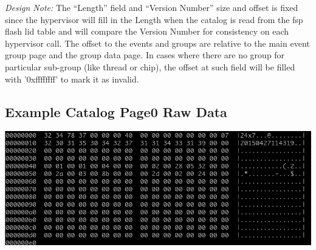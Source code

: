 \documentclass[14]{article}
\begin{document}
\textit{Design Note:} The “Length” field and “Version Number” size and offset is fixed
since the hypervisor will fill in the Length when the catalog is read from the
fsp flash lid table and will compare the Version Number for consistency on each
hypervisor call. The offset to the events and groups are relative to the main
event group page and the group data page. In cases where there are no group for
particular sub-group (like thread or chip), the offset at such field will be
filled with '0xffffffff' to mark it as invalid.

\subsection{Example Catalog Page0 Raw Data}
\includegraphics[scale=0.6]{page0_raw.png}

\pagebreak
\end{document}
